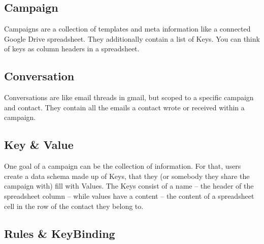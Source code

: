 \subsection{Campaign}

Campaigns are a collection of templates and meta information like a connected Google Drive spreadsheet. They additionally contain a list of Keys. You can think of keys as column headers in a spreadsheet.

\subsection{Conversation}

Conversations are like email threads in gmail, but scoped to a specific campaign and contact. They contain all the emails a contact wrote or received within a campaign.

\subsection{Key \& Value}


One goal of a campaign can be the collection of information. For that, users create a data schema made up of Keys, that they (or somebody they share the campaign with) fill with Values. The Keys consist of a name – the header of the spreadsheet column – while values have a content – the content of a spreadsheet cell in the row of the contact they belong to.
\pagebreak
\subsection{Rules \& KeyBinding}


